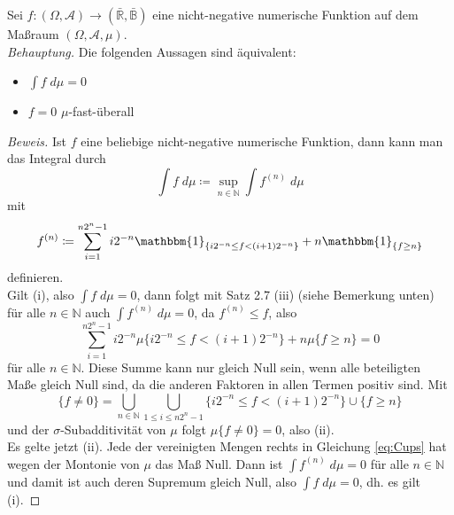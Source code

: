 \documentclass[10pt]{article}
\newcommand{\beh}{\textit{Behauptung. }}
\newenvironment{Aufgabe}[2][Aufgabe]{\begin{trivlist}
\item[\hskip \labelsep {\bfseries #1}\hskip \labelsep {\bfseries #2.}]}{\end{trivlist}}
\begin{document}
\begin{Aufgabe}{3}
Sei $f:(\Omega, \mathcal{A}) \rightarrow (\bar{\mathbb{R}}, \bar{\mathbb{B}})$ eine nicht-negative numerische Funktion auf dem Maßraum $(\Omega, \mathcal{A}, \mu)$. \\

\beh 
Die folgenden Aussagen sind äquivalent:

\begin{itemize}
	\item[(i)]  $\int f \; d\mu = 0$ 
	\item[(ii)]  $f = 0$ $\mu$-fast-überall 
\end{itemize}
\end{Aufgabe}

\begin{proof}[Beweis]

Ist $f$ eine beliebige nicht-negative numerische Funktion, dann kann man das Integral durch
$$
\int f \; d\mu \coloneqq \sup_{n \in \mathbb{N}} \int f^{(n)} \; d\mu
$$
mit
$$
f^{(n)} \coloneqq  \sum_{i=1}^{n2^n-1} i2^{-n} \mathbbm{1}_{\{i2^{-n} \leq f < (i+1)2^{-n}\}} + n\mathbbm{1}_{\{f \geq n\}}
$$
definieren. \\
Gilt (i), also $\int f \; d\mu = 0$, dann folgt mit Satz 2.7 (iii) (siehe Bemerkung unten) für alle $n \in \mathbb{N}$ auch $\int f^{(n)} \; d\mu = 0$, da $f^{(n)} \leq f$, also 
$$
\sum_{i=1}^{n2^n-1} i2^{-n} \mu\{i2^{-n} \leq f < (i+1)2^{-n}\} + n\mu\{f \geq n\} =  0
$$ 
für alle $n \in \mathbb{N}$. Diese Summe kann nur gleich Null sein, wenn alle beteiligten Maße gleich Null sind, da die anderen Faktoren in allen Termen positiv sind. Mit
\begin{equation}
\label{eq:Cups}
\{f \neq 0\} = \bigcup_{n \in \mathbb{N}} \bigcup_{1 \leq i \leq n2^n-1} \{i2^{-n} \leq f < (i+1)2^{-n}\} \cup \{f \geq n\}
\end{equation}
und der $\sigma$-Subadditivität von $\mu$ folgt $\mu\{f \neq 0\} = 0$, also (ii). \\
Es gelte jetzt (ii). Jede der vereinigten Mengen rechts in Gleichung \ref{eq:Cups} hat wegen der Montonie von $\mu$ das Maß Null. Dann ist $\int f^{(n)} \; d\mu = 0$ für alle $n \in \mathbb{N}$ und damit ist auch deren Supremum gleich Null, also $\int f \; d\mu = 0$, dh. es gilt (i).

\end{proof} 
\end{document}
